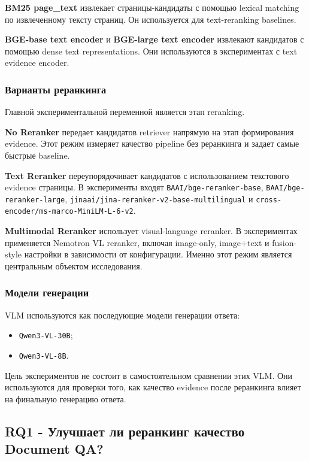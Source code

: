 \documentclass[conference]{IEEEtran}
\begin{document}
\textbf{BM25 page\_text} извлекает страницы-кандидаты с помощью lexical matching по извлеченному тексту страниц. Он используется для text-reranking baselines.

\textbf{BGE-base text encoder} и \textbf{BGE-large text encoder} извлекают кандидатов с помощью dense text representations. Они используются в экспериментах с text evidence encoder.

\subsubsection{Варианты реранкинга}

Главной экспериментальной переменной является этап reranking.

\textbf{No Reranker} передает кандидатов retriever напрямую на этап формирования evidence. Этот режим измеряет качество pipeline без реранкинга и задает самые быстрые baseline.

\textbf{Text Reranker} переупорядочивает кандидатов с использованием текстового evidence страницы. В эксперименты входят \texttt{BAAI/bge-reranker-base}, \texttt{BAAI/bge-reranker-large}, \texttt{jinaai/jina-reranker-v2-base-multilingual} и \texttt{cross-encoder/ms-marco-MiniLM-L-6-v2}.

\textbf{Multimodal Reranker} использует visual-language reranker. В экспериментах применяется Nemotron VL reranker, включая image-only, image+text и fusion-style настройки в зависимости от конфигурации. Именно этот режим является центральным объектом исследования.

\subsubsection{Модели генерации}

VLM используются как последующие модели генерации ответа:

\begin{itemize}
\item \texttt{Qwen3-VL-30B};
\item \texttt{Qwen3-VL-8B}.
\end{itemize}

Цель экспериментов не состоит в самостоятельном сравнении этих VLM. Они используются для проверки того, как качество evidence после реранкинга влияет на финальную генерацию ответа.

\subsection{RQ1 - Улучшает ли реранкинг качество Document QA?}
\end{document}
